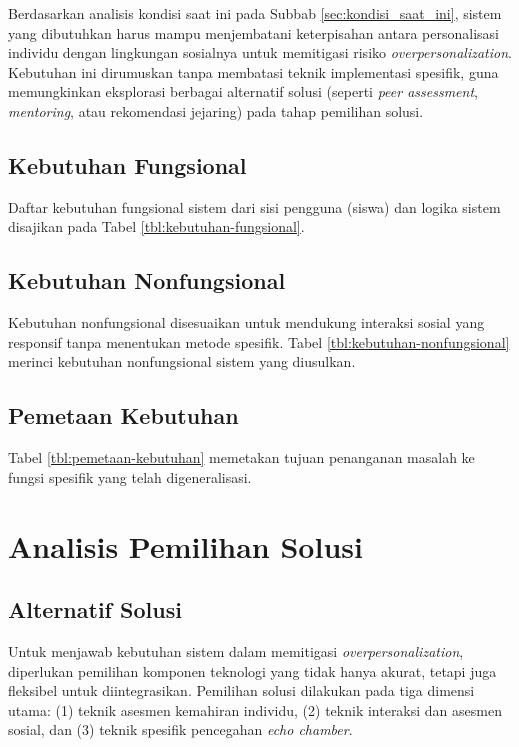 Berdasarkan analisis kondisi saat ini pada Subbab \ref{sec:kondisi_saat_ini}, sistem yang dibutuhkan harus mampu menjembatani keterpisahan antara personalisasi individu dengan lingkungan sosialnya untuk memitigasi risiko \textit{overpersonalization}. Kebutuhan ini dirumuskan tanpa membatasi teknik implementasi spesifik, guna memungkinkan eksplorasi berbagai alternatif solusi (seperti \textit{peer assessment}, \textit{mentoring}, atau rekomendasi jejaring) pada tahap pemilihan solusi.

\subsection{Kebutuhan Fungsional}
\label{ssec:kebutuhan_fungsional}
Daftar kebutuhan fungsional sistem dari sisi pengguna (siswa) dan logika sistem disajikan pada Tabel \ref{tbl:kebutuhan-fungsional}.



\subsection{Kebutuhan Nonfungsional}
\label{ssec:kebutuhan_nonfungsional}
Kebutuhan nonfungsional disesuaikan untuk mendukung interaksi sosial yang responsif tanpa menentukan metode spesifik.
Tabel \ref{tbl:kebutuhan-nonfungsional} merinci kebutuhan nonfungsional sistem yang diusulkan.



\subsection{Pemetaan Kebutuhan}
\label{ssec:pemetaan_kebutuhan}
Tabel \ref{tbl:pemetaan-kebutuhan} memetakan tujuan penanganan masalah ke fungsi spesifik yang telah digeneralisasi.



\section{Analisis Pemilihan Solusi}
\subsection{Alternatif Solusi}
\label{ssec:alternatif_solusi}
Untuk menjawab kebutuhan sistem dalam memitigasi \textit{overpersonalization}, diperlukan pemilihan komponen teknologi yang tidak hanya akurat, tetapi juga fleksibel untuk diintegrasikan. Pemilihan solusi dilakukan pada tiga dimensi utama: (1) teknik asesmen kemahiran individu, (2) teknik interaksi dan asesmen sosial, dan (3) teknik spesifik pencegahan \textit{echo chamber}.

